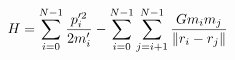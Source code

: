 \documentclass[preview]{standalone}
\begin{document}
\begin{align*}
\special{dvisvgm:raw <g id='unique000'>}H = \sum_{i=0}^{N-1}\frac{p'^2_i}{2m_i'} - \sum_{i=0}^{N-1} \sum_{j=i+1}^{N-1} \frac{G m_i m_j}{\norm{r_i - r_j}}\special{dvisvgm:raw </g>}
\end{align*}
\end{document}
